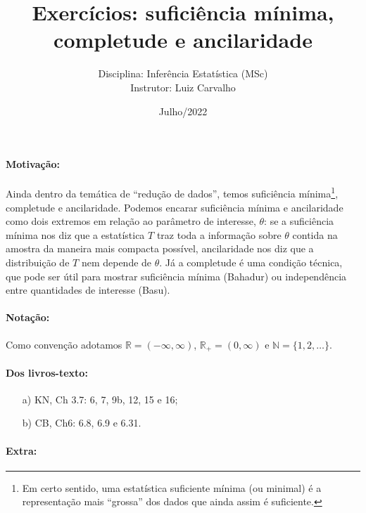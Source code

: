 \documentclass[a4paper,10pt, notitlepage]{report}
\title{Exercícios: suficiência mínima, completude e ancilaridade}
\author{Disciplina: Inferência Estatística (MSc) \\ Instrutor: Luiz Carvalho}
\date{Julho/2022}
\newcommand{\rpl}{\mathbb{R}_+}
\begin{document}
\maketitle

\paragraph{Motivação:} Ainda dentro da temática de ``redução de dados'', temos suficiência mínima\footnote{Em certo sentido, uma estatística suficiente mínima (ou minimal) é a representação mais ``grossa'' dos dados que ainda assim é suficiente.}, completude e ancilaridade.
Podemos encarar suficiência mínima e ancilaridade como dois extremos em relação ao parâmetro de interesse, $\theta$: se a suficiência mínima nos diz que a estatística $T$ traz toda a informação sobre $\theta$ contida na amostra  da maneira mais compacta possível, ancilaridade nos diz que a distribuição de $T$ nem depende de $\theta$. 
Já a completude é uma condição técnica, que pode ser útil para mostrar suficiência mínima (Bahadur) ou independência entre quantidades de interesse (Basu).

\paragraph{Notação:} Como convenção adotamos $\mathbb{R} = (-\infty, \infty)$, $\rpl = (0, \infty)$ e $\mathbb{N} = \{1, 2, \ldots \}$.

\paragraph{Dos livros-texto:}

\begin{itemize}
    \item[a)] KN, Ch 3.7: 6, 7, 9b, 12, 15 e 16;
    \item[b)] CB, Ch6: 6.8, 6.9 e 6.31.
\end{itemize}

\paragraph{Extra:}
\end{document}
